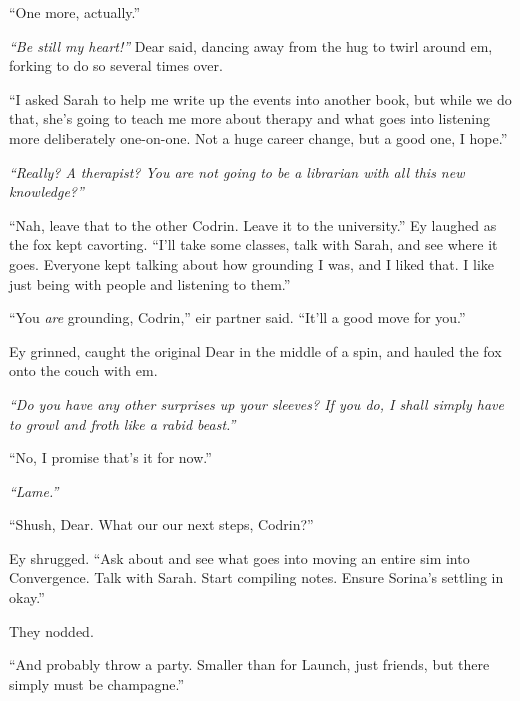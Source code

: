 ``One more, actually.''

\emph{``Be still my heart!''} Dear said, dancing away from the hug to twirl around em, forking to do so several times over.

``I asked Sarah to help me write up the events into another book, but while we do that, she's going to teach me more about therapy and what goes into listening more deliberately one-on-one. Not a huge career change, but a good one, I hope.''

\emph{``Really? A therapist? You are not going to be a librarian with all this new knowledge?''}

``Nah, leave that to the other Codrin. Leave it to the university.'' Ey laughed as the fox kept cavorting. ``I'll take some classes, talk with Sarah, and see where it goes. Everyone kept talking about how grounding I was, and I liked that. I like just being with people and listening to them.''

``You \emph{are} grounding, Codrin,'' eir partner said. ``It'll a good move for you.''

Ey grinned, caught the original Dear in the middle of a spin, and hauled the fox onto the couch with em.

\emph{``Do you have any other surprises up your sleeves? If you do, I shall simply have to growl and froth like a rabid beast.''}

``No, I promise that's it for now.''

\emph{``Lame.''}

``Shush, Dear. What our our next steps, Codrin?''

Ey shrugged. ``Ask about and see what goes into moving an entire sim into Convergence. Talk with Sarah. Start compiling notes. Ensure Sorina's settling in okay.''

They nodded.

``And probably throw a party. Smaller than for Launch, just friends, but there simply must be champagne.''
